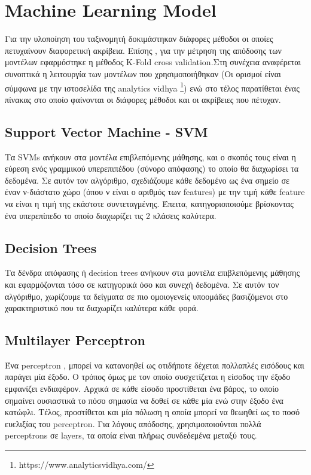 \section{Machine Learning Model}

Για την υλοποίηση του ταξινομητή δοκιμάστηκαν διάφορες μέθοδοι οι οποίες πετυχαίνουν διαφορετική ακρίβεια. Επίσης , για την μέτρηση της απόδοσης των μοντέλων εφαρμόστηκε η μέθοδος K-Fold cross validation.Στη συνέχεια αναφέρεται συνοπτικά η λειτουργία των μοντέλων που χρησιμοποιήθηκαν (Οι ορισμοί είναι σύμφωνα με την ιστοσελίδα της analytics vidhya \footnote{https://www.analyticsvidhya.com/}) ενώ στο τέλος παρατίθεται ένας πίνακας στο οποίο φαίνονται οι διάφορες μέθοδοι και οι ακρίβειες που πέτυχαν.

\subsection{Support Vector Machine - SVM}

Τα SVMs ανήκουν στα μοντέλα επιβλεπόμενης μάθησης, και ο σκοπός τους είναι η εύρεση ενός γραμμικού υπερεπιπέδου (σύνορο απόφασης) το οποίο θα διαχωρίσει τα δεδομένα. Σε αυτόν τον αλγόριθμο, σχεδιάζουμε κάθε δεδομένο ως ένα σημείο σε έναν ν-διάστατο χώρο (όπου ν είναι ο αριθμός των features) με την τιμή κάθε feature να είναι η τιμή της εκάστοτε συντεταγμένης. Έπειτα, κατηγοριοποιούμε βρίσκοντας ένα υπερεπίπεδο το οποίο διαχωρίζει τις 2 κλάσεις καλύτερα.

\subsection{Decision Trees}

Τα δένδρα απόφασης ή decision trees ανήκουν στα μοντέλα επιβλεπόμενης μάθησης και εφαρμόζονται τόσο σε κατηγορικά όσο και συνεχή δεδομένα. Σε αυτόν τον αλγόριθμο, χωρίζουμε τα δείγματα σε πιο ομοιογενείς υποομάδες βασιζόμενοι στο χαρακτηριστικό που τα διαχωρίζει καλύτερα κάθε φορά.

\subsection{Multilayer Perceptron}

Ένα perceptron , μπορεί να κατανοηθεί ως οτιδήποτε δέχεται πολλαπλές εισόδους και παράγει μία έξοδο. Ο τρόπος όμως με τον οποίο συσχετίζεται η είσοδος την έξοδο εμφανίζει ενδιαφέρον. Αρχικά σε κάθε είσοδο προστίθεται ένα βάρος, το οποίο σημαίνει ουσιαστικά το πόσο σημασία να δοθεί σε κάθε μία ενώ στην έξοδο ένα κατώφλι. Τέλος, προστίθεται και μία πόλωση η οποία μπορεί να θεωηθεί ως το ποσό ευελιξίας του perceptron. Για λόγους απόδοσης, χρησιμοποιούνται πολλά perceptrons σε layers, τα οποία είναι πλήρως συνδεδεμένα μεταξύ τους.   

